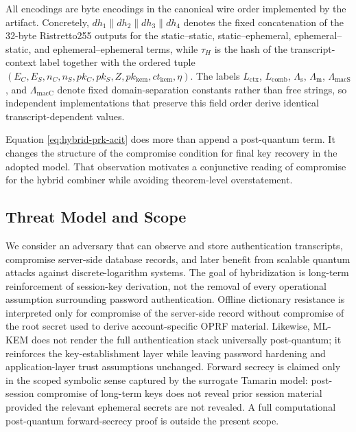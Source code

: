 \documentclass[conference]{IEEEtran}
\newcommand{\Label}[1]{L_{\mathrm{#1}}}
\newcommand{\KLabel}[1]{\Lambda_{\mathrm{#1}}}
\begin{document}
All encodings are byte encodings in the canonical wire order implemented by the artifact. Concretely, $dh_1 \| dh_2 \| dh_3 \| dh_4$ denotes the fixed concatenation of the 32-byte Ristretto255 outputs for the static--static, static--ephemeral, ephemeral--static, and ephemeral--ephemeral terms, while $\tau_H$ is the hash of the transcript-context label together with the ordered tuple $(E_C,E_S,n_C,n_S,pk_C,pk_S,Z,pk_{\mathrm{kem}},ct_{\mathrm{kem}},\eta)$. The labels $\Label{ctx}$, $\Label{comb}$, $\KLabel{s}$, $\KLabel{m}$, $\KLabel{macS}$, and $\KLabel{macC}$ denote fixed domain-separation constants rather than free strings, so independent implementations that preserve this field order derive identical transcript-dependent values.

Equation \eqref{eq:hybrid-prk-acit} does more than append a post-quantum term. It changes the structure of the compromise condition for final key recovery in the adopted model. That observation motivates a conjunctive reading of compromise for the hybrid combiner while avoiding theorem-level overstatement.

\subsection{Threat Model and Scope}

We consider an adversary that can observe and store authentication transcripts, compromise server-side database records, and later benefit from scalable quantum attacks against discrete-logarithm systems. The goal of hybridization is long-term reinforcement of session-key derivation, not the removal of every operational assumption surrounding password authentication. Offline dictionary resistance is interpreted only for compromise of the server-side record without compromise of the root secret used to derive account-specific OPRF material. Likewise, ML-KEM does not render the full authentication stack universally post-quantum; it reinforces the key-establishment layer while leaving password hardening and application-layer trust assumptions unchanged. Forward secrecy is claimed only in the scoped symbolic sense captured by the surrogate Tamarin model: post-session compromise of long-term keys does not reveal prior session material provided the relevant ephemeral secrets are not revealed. A full computational post-quantum forward-secrecy proof is outside the present scope.
\end{document}
